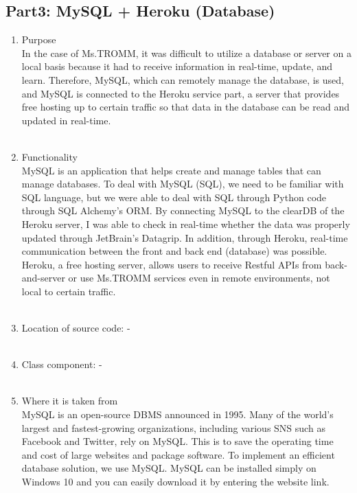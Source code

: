 \documentclass[conference]{IEEEtran}
\begin{document}
\subsection{Part3: MySQL + Heroku (Database)}
\begin{enumerate}
    \item Purpose \\
    In the case of Ms.TROMM, it was difficult to utilize a database or server on a local basis because it had to receive information in real-time, update, and learn. Therefore, MySQL, which can remotely manage the database, is used, and MySQL is connected to the Heroku service part, a server that provides free hosting up to certain traffic so that data in the database can be read and updated in real-time. \\ \\
    \item Functionality \\
    MySQL is an application that helps create and manage tables that can manage databases. To deal with MySQL (SQL), we need to be familiar with SQL language, but we were able to deal with SQL through Python code through SQL Alchemy's ORM. By connecting MySQL to the clearDB of the Heroku server, I was able to check in real-time whether the data was properly updated through JetBrain's Datagrip. In addition, through Heroku, real-time communication between the front and back end (database) was possible. Heroku, a free hosting server, allows users to receive Restful APIs from back-and-server or use Ms.TROMM services even in remote environments, not local to certain traffic.\\ \\
    \item Location of source code:  - \\ \\
    \item Class component: - \\ \\
    \item Where it is taken from \\
    MySQL is an open-source DBMS announced in 1995. Many of the world's largest and fastest-growing organizations, including various SNS such as Facebook and Twitter, rely on MySQL. This is to save the operating time and cost of large websites and package software. To implement an efficient database solution, we use MySQL. MySQL can be installed simply on Windows 10 and you can easily download it by entering the website link.\\

\end{enumerate}
\end{document}

